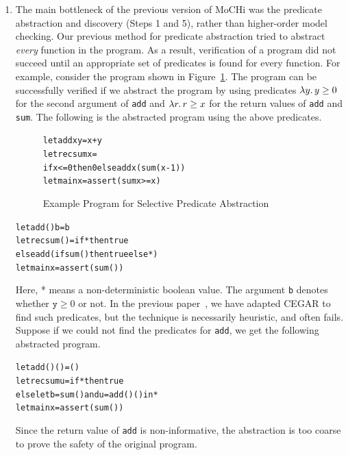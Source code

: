 \begin{enumerate}
      We can, however, obtain the following order-3 program instead by
      omitting the continuation \texttt{k1} of \texttt{check}, which is
      actually unnecessary since a partial application of \texttt{check}
      in the original program never causes side effects including an
      assertion failure.
\begin{alltt}
let rec check x f k = f x (\(\lambda\)_.check (x+1) f k)
let f x k = assert (x >= 0); k ()
let main n k = check n f k
\end{alltt}
      Our CPS transformation avoids such unnecessary insertions of
      continuations.  We formalize this transformation, called
      \emph{selective CPS transformation}.

\item The main bottleneck of the previous version of MoCHi was the
      predicate abstraction and discovery (Steps 1 and 5), rather than
      higher-order model checking.  Our previous method for predicate
      abstraction tried to abstract \emph{every} function in the
      program. As a result, verification of a program did not succeed
      until an appropriate set of predicates is found for every
      function.  For example, consider the program shown in
      Figure~\ref{fig:sum}.  The program can be successfully verified if
      we abstract the program by using predicates $\lambda{y}.\,{y \geq 0}$
      for the second argument of \texttt{add} and $\lambda{r}.\,{r \geq x}$
      for the return values of \texttt{add} and \texttt{sum}.  The
      following is the abstracted program using the above predicates.
\begin{figure}[t]
\begin{alltt}
let add x y = x + y
let rec sum x =
  if x <= 0 then 0 else add x (sum (x-1))
let main x = assert (sum x >= x)
\end{alltt}
\caption{Example Program for Selective Predicate Abstraction}
\label{fig:sum}
\end{figure}
\begin{alltt}
let add () b = b
let rec sum () = if * then true
  else add (if sum () then true else *)
let main x = assert (sum ())
\end{alltt}
      Here, * means a non-deterministic boolean value.  The argument
      \texttt{b} denotes whether $\mathtt{y} \geq 0$ or not.
      In the previous paper~\cite{KobayashiPLDI2011}, we have adapted
      CEGAR to find such predicates, but the technique is necessarily
      heuristic, and often fails.  Suppose if we could not find the
      predicates for \texttt{add}, we get the following abstracted
      program.
\begin{alltt}
let add () () = ()
let rec sum u = if * then true
  else let b = sum () and u = add () () in *
let main x = assert (sum ())
\end{alltt}
      Since the return value of \texttt{add} is non-informative, the
      abstraction is too coarse to prove the safety of the original program.


\end{enumerate}
